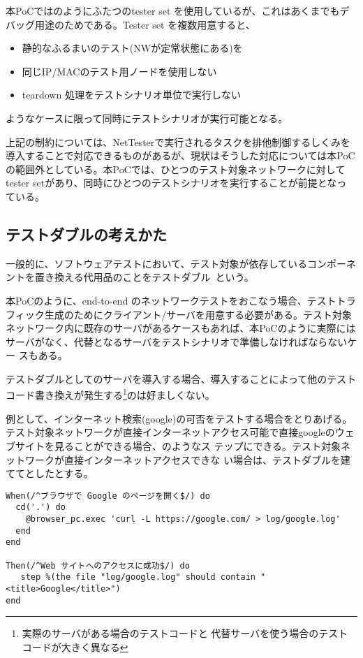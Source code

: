 本PoCではのようにふたつのtester set
を使用しているが、これはあくまでもデバッグ用途のためである。Tester set
を複数用意すると、
\begin{itemize}
 \item 静的なふるまいのテスト(NWが定常状態にある)を
 \item 同じIP/MACのテスト用ノードを使用しない
 \item teardown 処理をテストシナリオ単位で実行しない
\end{itemize}
ようなケースに限って同時にテストシナリオが実行可能となる。

上記の制約については、NetTesterで実行されるタスクを排他制御するしくみを
導入することで対応できるものがあるが、現状はそうした対応については本PoC
の範囲外としている。本PoCでは、ひとつのテスト対象ネットワークに対して
tester setがあり、同時にひとつのテストシナリオを実行することが前提となっ
ている。

  \subsection{テストダブルの考えかた}
一般的に、ソフトウェアテストにおいて、テスト対象が依存しているコンポーネ
ントを置き換える代用品のことをテストダブル~\cite{test-double}という。

本PoCのように、end-to-end のネットワークテストをおこなう場合、テストトラ
フィック生成のためにクライアント/サーバを用意する必要がある。テスト対象
ネットワーク内に既存のサーバがあるケースもあれば、本PoCのように実際には
サーバがなく、代替となるサーバをテストシナリオで準備しなければならないケー
スもある。

テストダブルとしてのサーバを導入する場合、導入することによって他のテスト
コード書き換えが発生する\footnote{実際のサーバがある場合のテストコードと
代替サーバを使う場合のテストコードが大きく異なる}のは好ましくない。

例として、インターネット検索(google)の可否をテストする場合をとりあげる。
テスト対象ネットワークが直接インターネットアクセス可能で直接googleのウェ
ブサイトを見ることができる場合、のようなス
テップにできる。テスト対象ネットワークが直接インターネットアクセスできな
い場合は、テストダブルを建ててとしたとする。

\begin{lstlisting}[caption=実際のサービスを利用する場合,label=lst:real-service-test]
When(/^ブラウザで Google のページを開く$/) do
  cd('.') do
    @browser_pc.exec 'curl -L https://google.com/ > log/google.log'
  end
end

Then(/^Web サイトへのアクセスに成功$/) do
   step %(the file "log/google.log" should contain "<title>Google</title>")
end
\end{lstlisting}

